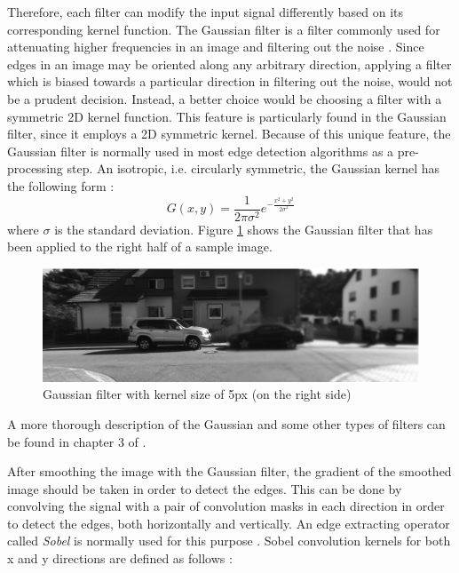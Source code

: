 Therefore, each filter can modify the input signal differently based on its corresponding kernel function.
The Gaussian filter is a filter commonly used for attenuating higher frequencies in an image and filtering out the noise \cite{wells86}. 
Since edges in an image may be oriented along any arbitrary direction, 
applying a filter which is biased towards a particular direction in filtering out the noise, would not be a prudent decision. Instead, a better choice would be choosing a filter 
with a symmetric 2D kernel function. 
This feature is particularly found in the Gaussian filter, since it employs a 2D symmetric kernel. Because of this unique feature, 
the Gaussian filter is normally used in most edge detection algorithms as a pre-processing step.
An isotropic, i.e. circularly symmetric, the Gaussian kernel has the following form \cite{sze11}:
\begin{equation}
G(x,y)=\frac{1}{2\pi \sigma ^{2}} e^{-\frac{x^{2}+y^{2}}{2\sigma^{2}}}
\end{equation}
where $\sigma$ is the standard deviation. 
Figure \ref{fig:gauss} shows the Gaussian filter that has been applied to the right half of a sample image.

\begin{figure}[H]
\centering
\includegraphics[scale=0.43]{left5Gblur}
\caption{Gaussian filter with kernel size of 5px (on the right side)}
\label{fig:gauss}
\end{figure} 


A more thorough description of the Gaussian and some other types of filters can be found in chapter 3 of \cite{sze11}.

After smoothing the image with the Gaussian filter, the gradient of the smoothed image should be taken in order to detect the edges. This can be done by convolving 
the signal with a pair of convolution masks in each direction in order to detect the edges, both horizontally and vertically. An edge extracting operator called {\it Sobel} is normally used
for this purpose \cite{sobel78}. 
Sobel convolution kernels for both x and y directions are defined as follows \cite{sobel78}:

